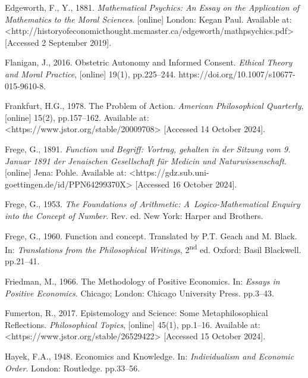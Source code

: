 Edgeworth, F., Y., 1881. \textit{Mathematical Psychics: An Essay on the Application of Mathematics to the Moral Sciences}. [online] London: Kegan Paul. Available at: {\textless}http://historyofeconomicthought.mcmaster.ca/edgeworth/mathpsychics.pdf{\textgreater} [Accessed 2 September 2019].



Flanigan, J., 2016. Obstetric Autonomy and Informed Consent. \textit{Ethical Theory and Moral Practice}, [online] 19(1), pp.225–244. https://doi.org/10.1007/s10677-015-9610-8.



Frankfurt, H.G., 1978. The Problem of Action. \textit{American Philosophical Quarterly}, [online] 15(2), pp.157–162. Available at: {\textless}https://www.jstor.org/stable/20009708{\textgreater} [Accessed 14 October 2024].



Frege, G., 1891. \textit{Function und Begriff: Vortrag, gehalten in der Sitzung vom 9. Januar 1891 der Jenaischen Gesellschaft für Medicin und Naturwissenschaft}. [online] Jena: Pohle. Available at: {\textless}https://gdz.sub.uni-goettingen.de/id/PPN64299370X{\textgreater} [Accessed 16 October 2024].



Frege, G., 1953. \textit{The Foundations of Arithmetic: A~Logico-Mathematical Enquiry into the Concept of Number}. Rev. ed. New York: Harper and Brothers.



Frege, G., 1960. Function and concept. Translated by P.T. Geach and M. Black. In: \textit{Translations from the Philosophical Writings}, 2\textsuperscript{nd} ed. Oxford: Basil Blackwell. pp.21–41.



Friedman, M., 1966. The Methodology of Positive Economics. In: \textit{Essays in Positive Economics}. Chicago; London: Chicago University Press. pp.3–43.



Fumerton, R., 2017. Epistemology and Science: Some Metaphilosophical Reflections. \textit{Philosophical Topics}, [online] 45(1), pp.1–16. Available at: {\textless}https://www.jstor.org/stable/26529422{\textgreater} [Accessed 15 October 2024].



Hayek, F.A., 1948. Economics and Knowledge. In: \textit{Individualism and Economic Order}. London: Routledge. pp.33–56.



